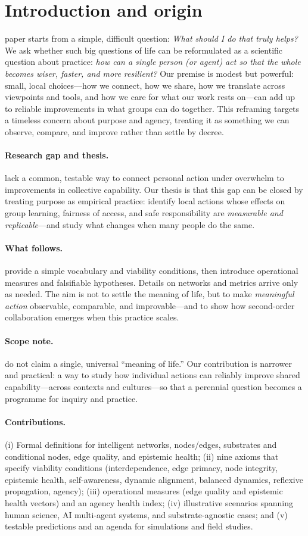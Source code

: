 \documentclass[12pt]{article}
\begin{document}
\section{Introduction and origin}\nThis paper starts from a simple, difficult question: \emph{What should I do that truly helps?} We ask whether such big questions of life can be reformulated as a scientific question about practice: \emph{how can a single person (or agent) act so that the whole becomes wiser, faster, and more resilient?} Our premise is modest but powerful: small, local choices—how we connect, how we share, how we translate across viewpoints and tools, and how we care for what our work rests on—can add up to reliable improvements in what groups can do together. This reframing targets a timeless concern about purpose and agency, treating it as something we can observe, compare, and improve rather than settle by decree.\n\n\paragraph{Research gap and thesis.}\nWe lack a common, testable way to connect personal action under overwhelm to improvements in collective capability. Our thesis is that this gap can be closed by treating purpose as empirical practice: identify local actions whose effects on group learning, fairness of access, and safe responsibility are \emph{measurable and replicable}—and study what changes when many people do the same.\n\n\paragraph{What follows.}\nWe provide a simple vocabulary and viability conditions, then introduce operational measures and falsifiable hypotheses. Details on networks and metrics arrive only as needed. The aim is not to settle the meaning of life, but to make \emph{meaningful action} observable, comparable, and improvable—and to show how second-order collaboration emerges when this practice scales.\n\n\paragraph{Scope note.}\nWe do not claim a single, universal ``meaning of life.'' Our contribution is narrower and practical: a way to study how individual actions can reliably improve shared capability—across contexts and cultures—so that a perennial question becomes a programme for inquiry and practice.\n
\paragraph{Contributions.} (i) Formal definitions for intelligent networks, nodes/edges, substrates and conditional nodes, edge quality, and epistemic health; (ii) nine axioms that specify viability conditions (interdependence, edge primacy, node integrity, epistemic health, self-awareness, dynamic alignment, balanced dynamics, reflexive propagation, agency); (iii) operational measures (edge quality and epistemic health vectors) and an agency health index; (iv) illustrative scenarios spanning human science, AI multi-agent systems, and substrate-agnostic cases; and (v) testable predictions and an agenda for simulations and field studies.
\end{document}
